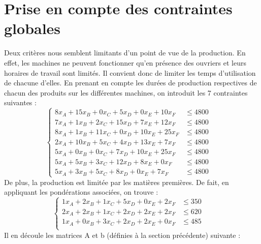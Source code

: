 \documentclass[12pt]{article}
\begin{document}
\section{Prise en compte des contraintes globales}
\label{globconst}
Deux critères nous semblent limitants d'un point de vue de la production. En effet, les machines ne peuvent fonctionner qu'en présence des ouvriers et leurs horaires de travail sont limités. Il convient donc de limiter les temps d'utilisation de chacune d'elles.
En prenant en compte les durées de production respectives de chacun des produits sur les différentes machines, on introduit les 7 contraintes suivantes :
\begin{equation*}
\left\{
\begin{aligned}
    8x_{A} + 15x_{B} + 0x_{C} + 5x_{D} + 0x_{E} + 10x_{F} &\leq 4800
    \quad\\
      7x_{A} + 1x_{B} + 2x_{C} + 15x_{D} + 7x_{E} + 12x_{F} &\leq 4800 \\
      8x_{A} + 1x_{B} + 11x_{C} + 0x_{D} + 10x_{E} + 25x_{F} &\leq 4800 \\
      2x_{A} + 10x_{B} + 5x_{C} + 4x_{D} + 13x_{E} + 7x_{F} &\leq 4800 \\
      5x_{A} + 0x_{B} + 0x_{C} + 7x_{D} + 10x_{E} + 25x_{F} &\leq 4800 \\
      5x_{A} + 5x_{B} + 3x_{C} + 12x_{D} + 8x_{E} + 0x_{F} &\leq 4800 \\
      5x_{A} + 3x_{B} + 5x_{C} + 8x_{D} + 0x_{E} + 7x_{F} &\leq 4800 
\end{aligned}
\right.
\end{equation*}
De plus, la production est limitée par les matières premières. De fait, en appliquant les pondérations associées, on trouve :
\begin{equation*}
\left\{
\begin{aligned}
         1x_{A} + 2x_{B} + 1x_{C} + 5x_{D} + 0x_{E} + 2x_{F} &\leq 350 \quad\\
      2x_{A} + 2x_{B} + 1x_{C} + 2x_{D} + 2x_{E} + 2x_{F} &\leq 620 \\
      1x_{A} + 0x_{B} + 3x_{C} + 2x_{D} + 2x_{E} + 0x_{F} &\leq 485 \\
\end{aligned}
\right.
\end{equation*}
Il en découle les matrices A et b (définies à la section précédente) suivante :
\end{document}
